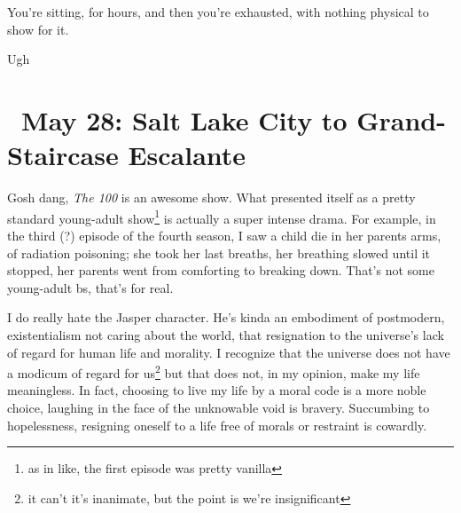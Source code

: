 \documentclass[../butidigress.tex]{subfiles}
\begin{document}
You're sitting, for hours, and then you're exhausted, with nothing physical to show for it.

\entryskip

Ugh

\section{\ May 28: Salt Lake City to Grand-Staircase Escalante}

Gosh dang, \textit{The 100} is an awesome show.
What presented itself as a pretty standard young-adult show\footnote{as in like, the first episode was pretty vanilla} is actually a super intense drama.
For example, in the third (?) episode of the fourth season, I saw a child die in her parents arms, of radiation poisoning; she took her last breaths, her breathing slowed until it stopped, her parents went from comforting to breaking down.
That's not some young-adult bs, that's for real.

I do really hate the Jasper character.
He's kinda an embodiment of postmodern, existentialism not caring about the world, that resignation to the universe's lack of regard for human life and morality.
I recognize that the universe does not have a modicum of regard for us\footnote{it can't it's inanimate, but the point is we're insignificant} but that does not, in my opinion, make my life meaningless.
In fact, choosing to live my life by a moral code is a more noble choice, laughing in the face of the unknowable void is bravery.
Succumbing to hopelessness, resigning oneself to a life free of morals or restraint is cowardly.

\renewcommand{\thesection}{\thechapter .\arabic{section}}

\newlength{\episkip}
\setlength{\episkip}{0.5cm}
\newcommand{\postepi}{\vspace{\episkip}\noindent\hfill\rule{0.5\textwidth}{1pt}\hfill\vspace{\episkip}}
\end{document}
